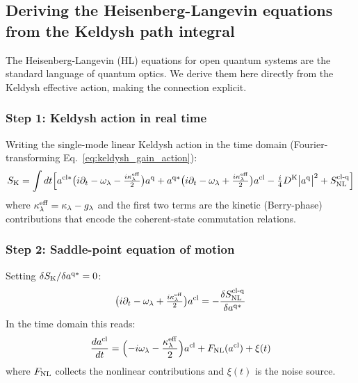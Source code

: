 \documentclass[12pt]{article}
\newcommand{\cl}{{\rm cl}}
\newcommand{\q}{{\rm q}}
\newcommand{\Keldysh}{{\rm K}}
\begin{document}
\subsection{Deriving the Heisenberg-Langevin equations from the
Keldysh path integral}
\label{sec:HL_derivation}

The Heisenberg-Langevin (HL) equations for open quantum systems are
the standard language of quantum optics.  We derive them here directly
from the Keldysh effective action, making the connection explicit.

\subsubsection*{Step 1: Keldysh action in real time}

Writing the single-mode linear Keldysh action in the time domain
(Fourier-transforming Eq.~\ref{eq:keldysh_gain_action}):
\begin{equation}
  S_\Keldysh = \int dt \Bigl[
  a^{\cl*}\bigl(i\partial_t - \omega_\lambda
  - \tfrac{i\kappa_\lambda^{\rm eff}}{2}\bigr)a^\q
  + a^{\q*}\bigl(i\partial_t - \omega_\lambda
  + \tfrac{i\kappa_\lambda^{\rm eff}}{2}\bigr)a^\cl
  - \tfrac{i}{4}D^\Keldysh\bigl|a^\q\bigr|^2
  + S_{\rm NL}^{\rm cl\text{-}q}\Bigr]
  \label{eq:Keldysh_time_domain}
\end{equation}
where $\kappa_\lambda^{\rm eff} = \kappa_\lambda - g_\lambda$ and the
first two terms are the kinetic (Berry-phase) contributions that encode
the coherent-state commutation relations.

\subsubsection*{Step 2: Saddle-point equation of motion}

Setting $\delta S_\Keldysh/\delta a^{\q*} = 0$:
\begin{equation}
  \bigl(i\partial_t - \omega_\lambda
  + \tfrac{i\kappa_\lambda^{\rm eff}}{2}\bigr)a^\cl
  = -\frac{\delta S_{\rm NL}^{\rm cl\text{-}q}}{\delta a^{\q*}}
  \label{eq:saddle_point_time}
\end{equation}
In the time domain this reads:
\begin{equation}
  \frac{da^\cl}{dt} = \Bigl(-i\omega_\lambda
  - \frac{\kappa_\lambda^{\rm eff}}{2}\Bigr)a^\cl
  + F_{\rm NL}(a^\cl) + \xi(t)
  \label{eq:Langevin_cnumber}
\end{equation}
where $F_{\rm NL}$ collects the nonlinear contributions and $\xi(t)$
is the noise source.
\end{document}
